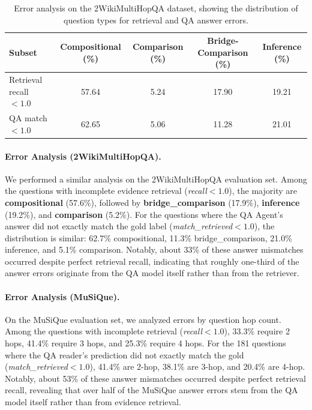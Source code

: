 \documentclass{article} %
\begin{document}

\begin{table}[ht]
\centering
\small
\setlength{\tabcolsep}{3pt} %
\caption{Error analysis on the 2WikiMultiHopQA dataset, showing the distribution of question types for retrieval and QA answer errors.}
\begin{tabular}{l|c|c|c|c}
\toprule
\textbf{Subset} & \textbf{Compositional (\%)} & \textbf{Comparison (\%)} &
\textbf{Bridge-Comparison (\%)} & \textbf{Inference (\%)} \\
\midrule
Retrieval recall $<1.0$ & 57.64 & 5.24 & 17.90 & 19.21 \\
\midrule
QA match $<1.0$         & 62.65 & 5.06 & 11.28 & 21.01 \\
\bottomrule
\end{tabular}
\label{tab:2wiki-error-types}
\end{table}


\paragraph{Error Analysis (2WikiMultiHopQA).}
We performed a similar analysis on the 2WikiMultiHopQA evaluation set.
Among the questions with incomplete evidence retrieval (\textit{recall}$<1.0$),
the majority are \textbf{compositional} (57.6\%), followed by
\textbf{bridge\_comparison} (17.9\%), \textbf{inference} (19.2\%), and
\textbf{comparison} (5.2\%).
For the questions where the QA Agent’s answer did not exactly match the gold label
(\textit{match\_retrieved}$<1.0$), the distribution is similar:
62.7\% compositional, 11.3\% bridge\_comparison, 21.0\% inference, and 5.1\% comparison. Notably, about 33\% of these answer mismatches occurred despite perfect retrieval recall, indicating that roughly one-third of the answer errors originate from the QA model itself rather than from the retriever.


\paragraph{Error Analysis (MuSiQue).}
On the MuSiQue evaluation set, we analyzed errors by question hop count. Among the questions with incomplete retrieval (\textit{recall}$<1.0$),
33.3\% require 2 hops, 41.4\% require 3 hops, and 25.3\% require 4 hops.
For the 181 questions where the QA reader’s prediction did not exactly match the gold
(\textit{match\_retrieved}$<1.0$),
41.4\% are 2-hop, 38.1\% are 3-hop, and 20.4\% are 4-hop.
Notably, about 53\% of these answer mismatches occurred despite perfect retrieval recall, revealing that over half of the MuSiQue answer errors stem from the QA model itself rather than from evidence retrieval.
\end{document}
